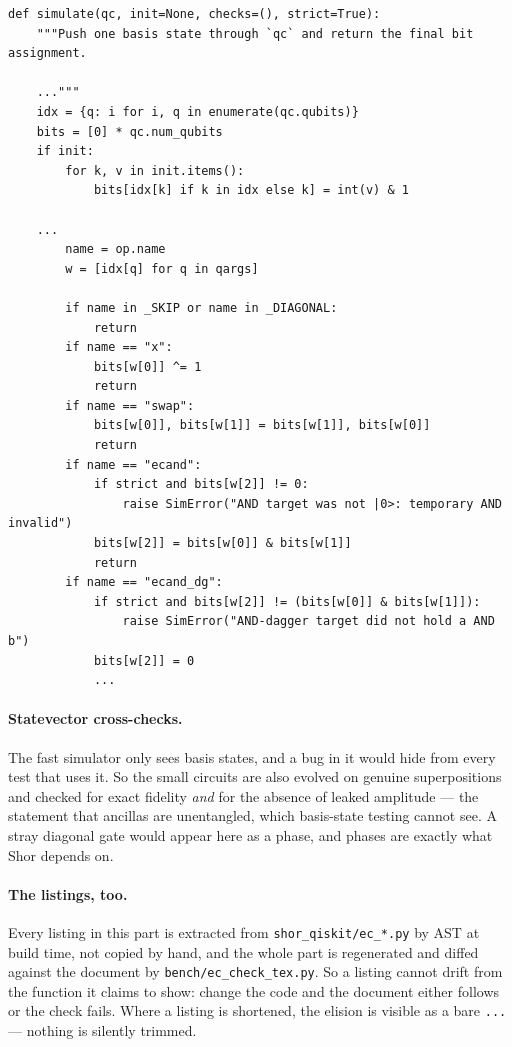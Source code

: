 \documentclass[11pt]{article}
\newcommand{\code}[1]{\texttt{#1}}
\theoremstyle{plain}
\theoremstyle{remark}
\begin{document}
\begin{lstlisting}
def simulate(qc, init=None, checks=(), strict=True):
    """Push one basis state through `qc` and return the final bit assignment.

    ..."""
    idx = {q: i for i, q in enumerate(qc.qubits)}
    bits = [0] * qc.num_qubits
    if init:
        for k, v in init.items():
            bits[idx[k] if k in idx else k] = int(v) & 1

    ...
        name = op.name
        w = [idx[q] for q in qargs]

        if name in _SKIP or name in _DIAGONAL:
            return
        if name == "x":
            bits[w[0]] ^= 1
            return
        if name == "swap":
            bits[w[0]], bits[w[1]] = bits[w[1]], bits[w[0]]
            return
        if name == "ecand":
            if strict and bits[w[2]] != 0:
                raise SimError("AND target was not |0>: temporary AND invalid")
            bits[w[2]] = bits[w[0]] & bits[w[1]]
            return
        if name == "ecand_dg":
            if strict and bits[w[2]] != (bits[w[0]] & bits[w[1]]):
                raise SimError("AND-dagger target did not hold a AND b")
            bits[w[2]] = 0
            ...
\end{lstlisting}

\paragraph{Statevector cross-checks.}
The fast simulator only sees basis states, and a bug in it would hide from every test that uses it.
So the small circuits are also evolved on genuine superpositions and checked for exact fidelity
\emph{and} for the absence of leaked amplitude --- the statement that ancillas are unentangled,
which basis-state testing cannot see. A stray diagonal gate would appear here as a phase, and phases
are exactly what Shor depends on.

\paragraph{The listings, too.}
Every listing in this part is extracted from \code{shor\_qiskit/ec\_*.py} by AST at build time, not
copied by hand, and the whole part is regenerated and diffed against the document by
\code{bench/ec\_check\_tex.py}. So a listing cannot drift from the function it claims to show:
change the code and the document either follows or the check fails. Where a listing is shortened,
the elision is visible as a bare \code{...} --- nothing is silently trimmed.
\end{document}
